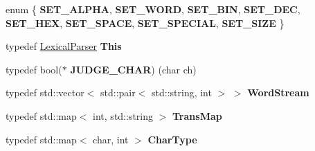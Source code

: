 \begin{DoxyCompactItemize}
enum \{ \newline
{\bfseries S\+E\+T\+\_\+\+A\+L\+P\+HA}, 
{\bfseries S\+E\+T\+\_\+\+W\+O\+RD}, 
{\bfseries S\+E\+T\+\_\+\+B\+IN}, 
{\bfseries S\+E\+T\+\_\+\+D\+EC}, 
\newline
{\bfseries S\+E\+T\+\_\+\+H\+EX}, 
{\bfseries S\+E\+T\+\_\+\+S\+P\+A\+CE}, 
{\bfseries S\+E\+T\+\_\+\+S\+P\+E\+C\+I\+AL}, 
{\bfseries S\+E\+T\+\_\+\+S\+I\+ZE}
 \}
\item 
\mbox{\label{class_lexical_parser_a897e5fc2ad0766512b6e7c7ae43f66a7}} 
typedef \hyperlink{class_lexical_parser}{Lexical\+Parser} {\bfseries This}
\item 
\mbox{\label{class_lexical_parser_adb3ebe580622a5bfa2cf76d11e0bf801}} 
typedef bool($\ast$ {\bfseries J\+U\+D\+G\+E\+\_\+\+C\+H\+AR}) (char ch)
\item 
\mbox{\label{class_lexical_parser_a2054bede65a625e955f15113d3fdbbe6}} 
typedef std\+::vector$<$ std\+::pair$<$ std\+::string, int $>$ $>$ {\bfseries Word\+Stream}
\item 
\mbox{\label{class_lexical_parser_a598b14788f03ae82bb3b419a63836999}} 
typedef std\+::map$<$ int, std\+::string $>$ {\bfseries Trans\+Map}
\item 
\mbox{\label{class_lexical_parser_a3122b02b703d5ab1328835bb3701bedf}} 
typedef std\+::map$<$ char, int $>$ {\bfseries Char\+Type}
\end{DoxyCompactItemize}
